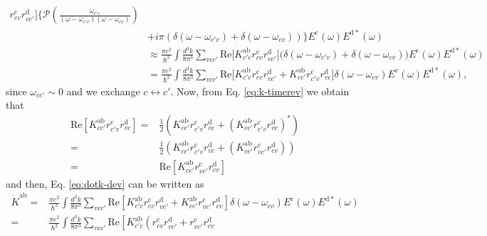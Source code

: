 \documentclass[prb,11pt,tightenlines,twocolumn,aps]{revtex4-1}
\begin{document}
\begin{widetext}
\begin{align}
r^{\mathrm{c}}_{cv}r^{\mathrm{d}}_{vc'}
\Big]
\Big\{
\mathcal{P}\left(
\frac{\omega_{c'c}}{(\omega-\omega_{c'v})(\omega-\omega_{cv})}
\right) 
\nonumber\\
&+
i\pi 
\left(
\delta(\omega-\omega_{c'v}) 
+
\delta(\omega-\omega_{cv}) 
\right) 
\Big\}
E^{\mathrm{c}}(\omega)E^{\mathrm{d}*}(\omega) 
\nonumber\\
&\approx 
\frac{\pi e^2}{\hbar^2}
\int\frac{d^3k}{8\pi^3}
\sum_{vcc'}
\mathrm{Re}\Big[
K^{\mathrm{ab}}_{c'c}
r^{\mathrm{c}}_{cv}r^{\mathrm{d}}_{vc'}
\Big]
\Big(
\delta(\omega-\omega_{c'v}) 
+
\delta(\omega-\omega_{cv}) 
\Big) 
E^{\mathrm{c}}(\omega)E^{\mathrm{d}*}(\omega) 
\nonumber\\
&=
\frac{\pi e^2}{\hbar^2}
\int\frac{d^3k}{8\pi^3}
\sum_{vcc'}
\mathrm{Re}
\Big[ 
K^{\mathrm{ab}}_{c'c} 
r^{\mathrm{c}}_{cv}r^{\mathrm{d}}_{vc'}
+ 
K^{\mathrm{ab}}_{cc'} 
r^{\mathrm{c}}_{c'v}r^{\mathrm{d}}_{vc}
\Big]
\delta(\omega-\omega_{cv})  
E^{\mathrm{c}}(\omega)E^{\mathrm{d}*}(\omega),
\label{eq:dotk-dev}
\end{align}
since $\omega_{cc'} \sim 0$ and we exchange $c\leftrightarrow c'$. Now, from
Eq. \eqref{eq:k-timerev} we obtain that 
\begin{align}
\mathrm{Re} \left[ 
K^{\mathrm{ab}}_{cc'} r^{\mathrm{c}}_{c'v} r^{\mathrm{d}}_{vc} 
\right] 
=&
\frac{1}{2} \left(
 K^{\mathrm{ab}}_{cc'} r^{\mathrm{c}}_{c'v} r^{\mathrm{d}}_{vc} +
(K^{\mathrm{ab}}_{cc'} r^{\mathrm{c}}_{c'v} r^{\mathrm{d}}_{vc} )^{*}
\right)
\nonumber \\
=&
\frac{1}{2} \left(
 K^{\mathrm{ab}}_{cc'} r^{\mathrm{c}}_{c'v} r^{\mathrm{d}}_{vc} +
(K^{\mathrm{ab}}_{cc'} r^{\mathrm{c}}_{vc'} r^{\mathrm{d}}_{cv} )
\right)
\nonumber \\
=&
\mathrm{Re}
\left[
K^{\mathrm{ab}}_{cc'} r^{\mathrm{c}}_{vc'} r^{\mathrm{d}}_{cv}
\right]
\label{eq:realk}
\end{align}
and then, Eq. \eqref{eq:dotk-dev} can be written as
\begin{align}
\dot{K}^{\mathrm{ab}}
=&
\frac{\pi e^{2}}{\hbar^{2}} \int \frac{d^{3}k}{8 \pi^{3}}
\sum_{vcc'} \mathrm{Re} 
\left[ 
K^{\mathrm{ab}}_{c'c} r^{\mathrm{c}}_{cv} r^{\mathrm{d}}_{vc'} + 
K^{\mathrm{ab}}_{cc'} r^{\mathrm{c}}_{vc'} r^{\mathrm{d}}_{cv}
\right]
\delta(\omega - \omega_{cv}) 
E^{\mathrm{c}}(\omega) E^{\mathrm{d*}}(\omega) 
\nonumber \\
=&
\frac{\pi e^{2}}{\hbar^{2}} \int \frac{d^{3}k}{8 \pi^{3}}
\sum_{vcc'} \mathrm{Re} 
\left[ 
K^{\mathrm{ab}}_{c'c} 
\left(
r^{\mathrm{c}}_{cv} r^{\mathrm{d}}_{vc'} + 
r^{\mathrm{c}}_{vc'} r^{\mathrm{d}}_{cv}

\end{align}
\end{widetext}
\end{document}
